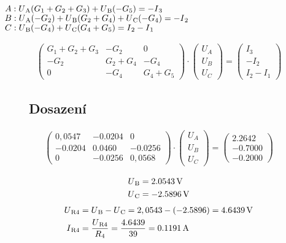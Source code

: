 	$A: U\textsubscript{A}(G\textsubscript{1}+G\textsubscript{2}+G\textsubscript{3}) + U\textsubscript{B}(-G\textsubscript{5}) = -I\textsubscript{3} \\$
	$B: U\textsubscript{A}(-G\textsubscript{2}) + U\textsubscript{B}(G\textsubscript{2}+G\textsubscript{4}) + U\textsubscript{C}(-G\textsubscript{4}) = -I\textsubscript{2} \\$
	$C: U\textsubscript{B}(-G\textsubscript{4}) + U\textsubscript{C}(G\textsubscript{4}+G\textsubscript{5}) = I\textsubscript{2} - I\textsubscript{1}$
\begin{figure}[H]
    \centering
	\begin{align*}
	   \begin{pmatrix}
		G_{1}+G_{2}+G_{3}&-G_{2}&0\\
		-G_{2}&G_{2}+G_{4}&-G_{4}\\
		0&-G_{4}&G_{4}+G_{5}
	   \end{pmatrix}
            \cdot 
	\begin{pmatrix}
		U_{A}\\
		U_{B}\\
		U_{C}
	\end{pmatrix}
            =
	\begin{pmatrix}
		I_{3}\\
		-I_{2}\\
		I_{2}-I_{1}
	\end{pmatrix}
    \end{align*}
\newline

\subsection{Dosazení}
    \begin{align*}
	\begin{pmatrix}
		0,0547&-0.0204&0\\
		-0.0204&0.0460&-0.0256\\
		0&-0.0256&0,0568
	\end{pmatrix}
            \cdot
	\begin{pmatrix}
		U_{A}\\
		U_{B}\\
		U_{C}
	\end{pmatrix}
            =	
        \begin{pmatrix}
		2.2642\\
		-0.7000 \\
		-0.2000
	\end{pmatrix}
    \end{align*}
    
    \begin{align*}
        U\textsubscript{B} &= \SI{2,0543}{\volt} \\
        U\textsubscript{C} &= \SI{-2.5896}{\volt}
    \end{align*}
    \begin{align*}
        U\textsubscript{R4} &= U\textsubscript{B} - U\textsubscript{C} = 2,0543 - (-2.5896) = \SI{4.6439}{\volt}\\
         I\textsubscript{R4} &= \frac{U\textsubscript{R4}}{R\textsubscript{4}} = \frac{4.6439}{39} = \SI{0.1191}{\ampere}
    \end{align*}
\end{figure}